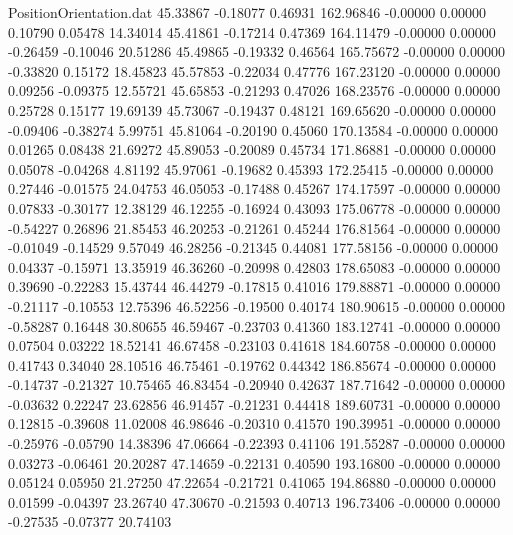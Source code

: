\begin{filecontents}{PositionOrientation.dat}
  45.33867   -0.18077    0.46931   162.96846   -0.00000    0.00000    0.10790    0.05478   14.34014
  45.41861   -0.17214    0.47369   164.11479   -0.00000    0.00000   -0.26459   -0.10046   20.51286
  45.49865   -0.19332    0.46564   165.75672   -0.00000    0.00000   -0.33820    0.15172   18.45823
  45.57853   -0.22034    0.47776   167.23120   -0.00000    0.00000    0.09256   -0.09375   12.55721
  45.65853   -0.21293    0.47026   168.23576   -0.00000    0.00000    0.25728    0.15177   19.69139
  45.73067   -0.19437    0.48121   169.65620   -0.00000    0.00000   -0.09406   -0.38274    5.99751
  45.81064   -0.20190    0.45060   170.13584   -0.00000    0.00000    0.01265    0.08438   21.69272
  45.89053   -0.20089    0.45734   171.86881   -0.00000    0.00000    0.05078   -0.04268    4.81192
  45.97061   -0.19682    0.45393   172.25415   -0.00000    0.00000    0.27446   -0.01575   24.04753
  46.05053   -0.17488    0.45267   174.17597   -0.00000    0.00000    0.07833   -0.30177   12.38129
  46.12255   -0.16924    0.43093   175.06778   -0.00000    0.00000   -0.54227    0.26896   21.85453
  46.20253   -0.21261    0.45244   176.81564   -0.00000    0.00000   -0.01049   -0.14529    9.57049
  46.28256   -0.21345    0.44081   177.58156   -0.00000    0.00000    0.04337   -0.15971   13.35919
  46.36260   -0.20998    0.42803   178.65083   -0.00000    0.00000    0.39690   -0.22283   15.43744
  46.44279   -0.17815    0.41016   179.88871   -0.00000    0.00000   -0.21117   -0.10553   12.75396
  46.52256   -0.19500    0.40174   180.90615   -0.00000    0.00000   -0.58287    0.16448   30.80655
  46.59467   -0.23703    0.41360   183.12741   -0.00000    0.00000    0.07504    0.03222   18.52141
  46.67458   -0.23103    0.41618   184.60758   -0.00000    0.00000    0.41743    0.34040   28.10516
  46.75461   -0.19762    0.44342   186.85674   -0.00000    0.00000   -0.14737   -0.21327   10.75465
  46.83454   -0.20940    0.42637   187.71642   -0.00000    0.00000   -0.03632    0.22247   23.62856
  46.91457   -0.21231    0.44418   189.60731   -0.00000    0.00000    0.12815   -0.39608   11.02008
  46.98646   -0.20310    0.41570   190.39951   -0.00000    0.00000   -0.25976   -0.05790   14.38396
  47.06664   -0.22393    0.41106   191.55287   -0.00000    0.00000    0.03273   -0.06461   20.20287
  47.14659   -0.22131    0.40590   193.16800   -0.00000    0.00000    0.05124    0.05950   21.27250
  47.22654   -0.21721    0.41065   194.86880   -0.00000    0.00000    0.01599   -0.04397   23.26740
  47.30670   -0.21593    0.40713   196.73406   -0.00000    0.00000   -0.27535   -0.07377   20.74103

\end{filecontents}
